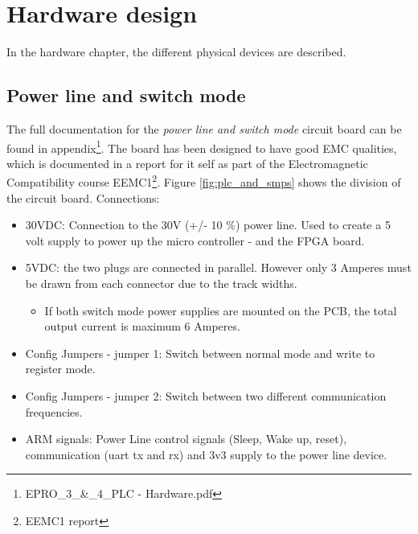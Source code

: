 \chapter{Hardware design}
In the hardware chapter, the different physical devices are described.
\section{Power line and switch mode}
%
The full documentation for the \textit{power line and switch mode} circuit board can be found in appendix\footnote{EPRO\_3\_\&\_4\_PLC - Hardware.pdf}. The board has been designed to have good EMC qualities, which is documented in a report for it self as part of the Electromagnetic Compatibility course EEMC1\footnote{EEMC1 report}.
\p Figure \ref{fig:plc_and_smps} shows the division of the circuit board.
\p Connections:
\begin{itemize}
	\item 30VDC: Connection to the 30V (+/- 10 \%) power line. Used to create a 5 volt supply to power up the micro controller - and the FPGA board.
	\item 5VDC: the two plugs are connected in parallel. However only 3 Amperes must be drawn from each connector due to the track widths.
	\begin{itemize}
		\item If both switch mode power supplies are mounted on the PCB, the total output current is maximum 6 Amperes.
	\end{itemize}
	\item Config Jumpers - jumper 1: Switch between normal mode and write to register mode.
	\item Config Jumpers - jumper 2: Switch between two different communication frequencies.
	\item ARM signals: Power Line control signals (Sleep, Wake up, reset), communication (uart tx and rx) and 3v3 supply to the power line device.
\end{itemize}

